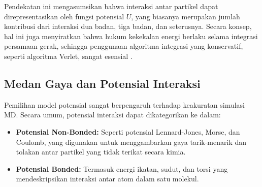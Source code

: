 Pendekatan ini mengasumsikan bahwa interaksi antar partikel dapat direpresentasikan oleh fungsi potensial \( U \), yang biasanya merupakan jumlah kontribusi dari interaksi dua badan, tiga badan, dan seterusnya. Secara konsep, hal ini juga menyiratkan bahwa hukum kekekalan energi berlaku selama integrasi persamaan gerak, sehingga penggunaan algoritma integrasi yang konservatif, seperti algoritma Verlet, sangat esensial \citep{Allen1989}. \subsection{Medan Gaya dan Potensial Interaksi}
Pemilihan model potensial sangat berpengaruh terhadap keakuratan simulasi MD. Secara umum, potensial interaksi dapat dikategorikan ke dalam:
\begin{itemize}
    \item \textbf{Potensial Non-Bonded:} Seperti potensial Lennard-Jones, Morse, dan Coulomb, yang digunakan untuk menggambarkan gaya tarik-menarik dan tolakan antar partikel yang tidak terikat secara kimia. \item \textbf{Potensial Bonded:} Termasuk energi ikatan, sudut, dan torsi yang mendeskripsikan interaksi antar atom dalam satu molekul. \end{itemize}

